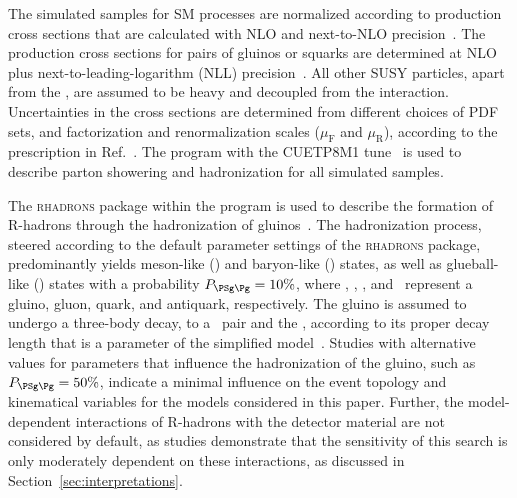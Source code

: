 The simulated samples for SM processes are normalized according to
production cross sections that are calculated with NLO and next-to-NLO
precision~\cite{Alwall2014, wphys, fewz, wwxs, top++, nlotop,
  powheg_top_Wt}. The production cross sections for pairs of gluinos
or squarks are determined at NLO plus next-to-leading-logarithm (NLL)
precision~\cite{Beenakker:1996ch, Kulesza:2008jb, Kulesza:2009kq,
  Beenakker:2009ha, Beenakker:2011fu, Borschensky:2014cia}. All other
SUSY particles, apart from the \PSGczDo, are assumed to be heavy and
decoupled from the interaction. Uncertainties in the cross sections
are determined from different choices of PDF sets, and factorization
and renormalization scales ($\mu_\mathrm{F}$ and $\mu_\mathrm{R}$),
according to the prescription in Ref.~\cite{Borschensky:2014cia}. The
\PYTHIA program with the \textsc{CUETP8M1} tune~\cite{Skands:2014pea,
  Khachatryan:2015pea} is used to describe parton showering and
hadronization for all simulated samples.

The \textsc{rhadrons} package within the  program is used
to describe the formation of R-hadrons through the hadronization of
gluinos~\cite{Fairbairn:2006gg, Kraan:2004tz, Mackeprang:2006gx}. The
hadronization process, steered according to the default parameter
settings of the \textsc{rhadrons} package, predominantly yields
meson-like (\PSg\Pq\Paq) and baryon-like (\PSg\Pq\Pq\Pq) states, as
well as glueball-like (\PSg\Pg) states with a probability $P_{\PSg\Pg}
= 10\%$, where \PSg, \Pg, \Pq, and \Paq\ represent a gluino, gluon,
quark, and antiquark, respectively. The gluino is assumed to undergo a
three-body decay, to a \Pq\Paq\ pair and the \PSGczDo, according to
its proper decay length \ctau that is a parameter of the simplified
model~\cite{Buchmueller:2017uqu}. Studies with alternative values for
parameters that influence the hadronization of the gluino, such as
$P_{\PSg\Pg} = 50\%$, indicate a minimal influence on the event
topology and kinematical variables for the models considered in this
paper. Further, the model-dependent interactions of R-hadrons with the
detector material are not considered by default, as studies
demonstrate that the sensitivity of this search is only moderately
dependent on these interactions, as discussed in
Section~\ref{sec:interpretations}.

